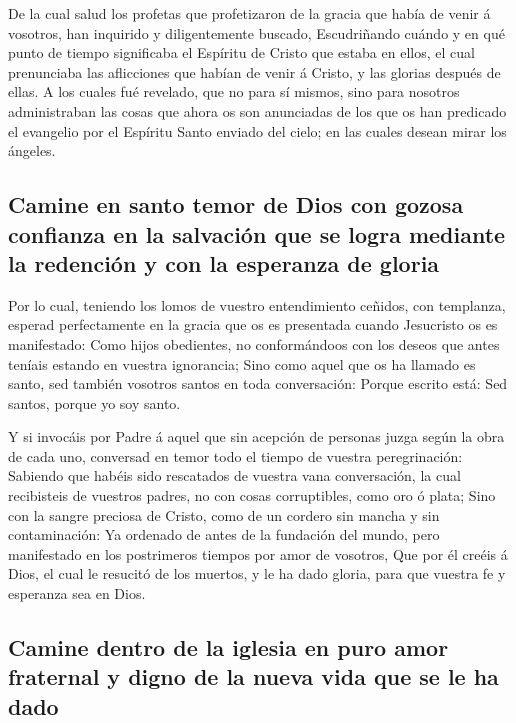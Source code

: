  De la cual salud los profetas que profetizaron de la
gracia que había de venir á vosotros, han inquirido y diligentemente
buscado,  Escudriñando cuándo y en qué punto de tiempo
significaba el Espíritu de Cristo que estaba en ellos, el cual
prenunciaba las aflicciones que habían de venir á Cristo, y las glorias
después de ellas.  A los cuales fué revelado, que no para
sí mismos, sino para nosotros administraban las cosas que ahora os son
anunciadas de los que os han predicado el evangelio por el Espíritu
Santo enviado del cielo; en las cuales desean mirar los ángeles.

\hypertarget{camine-en-santo-temor-de-dios-con-gozosa-confianza-en-la-salvaciuxf3n-que-se-logra-mediante-la-redenciuxf3n-y-con-la-esperanza-de-gloria}{%
\subsection{Camine en santo temor de Dios con gozosa confianza en la
salvación que se logra mediante la redención y con la esperanza de
gloria}\label{camine-en-santo-temor-de-dios-con-gozosa-confianza-en-la-salvaciuxf3n-que-se-logra-mediante-la-redenciuxf3n-y-con-la-esperanza-de-gloria}}

 Por lo cual, teniendo los lomos de vuestro entendimiento
ceñidos, con templanza, esperad perfectamente en la gracia que os es
presentada cuando Jesucristo os es manifestado:  Como hijos
obedientes, no conformándoos con los deseos que antes teníais estando en
vuestra ignorancia;  Sino como aquel que os ha llamado es
santo, sed también vosotros santos en toda conversación: 
Porque escrito está: Sed santos, porque yo soy santo.

 Y si invocáis por Padre á aquel que sin acepción de
personas juzga según la obra de cada uno, conversad en temor todo el
tiempo de vuestra peregrinación:  Sabiendo que habéis sido
rescatados de vuestra vana conversación, la cual recibisteis de vuestros
padres, no con cosas corruptibles, como oro ó plata;  Sino
con la sangre preciosa de Cristo, como de un cordero sin mancha y sin
contaminación:  Ya ordenado de antes de la fundación del
mundo, pero manifestado en los postrimeros tiempos por amor de vosotros,
 Que por él creéis á Dios, el cual le resucitó de los
muertos, y le ha dado gloria, para que vuestra fe y esperanza sea en
Dios.

\hypertarget{camine-dentro-de-la-iglesia-en-puro-amor-fraternal-y-digno-de-la-nueva-vida-que-se-le-ha-dado}{%
\subsection{Camine dentro de la iglesia en puro amor fraternal y digno
de la nueva vida que se le ha
dado}\label{camine-dentro-de-la-iglesia-en-puro-amor-fraternal-y-digno-de-la-nueva-vida-que-se-le-ha-dado}}

